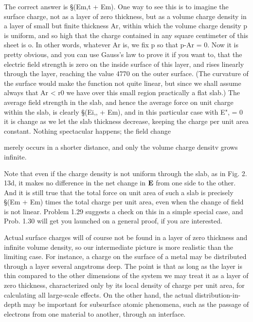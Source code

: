 The correct answer is §(Em,t + Em). One way to see this is to
imagine the surface charge, not as a layer of zero thickness, but as a
volume charge density in a layer of small but finite thickness Ar,
within which the volume charge density p is uniform, and so high that
the charge contained in any square centimeter of this sheet is o. In
other words, whatever Ar is, we fix p so that p-Ar = 0. Now it is
pretty obvious, and you can use Gauss's law to prove it if you want to,
that the electric field strength is zero on the inside surface of this
layer, and rises linearly through the layer, reaching the value 4770 on
the outer surface. (The curvature of the surface would make the
function not quite linear, but since we shall assume always that
Ar < r0 we have over this small region practically a flat slab.) The
average field strength in the slab, and hence the average force on unit
charge within the slab, is clearly §(Ei,, + Em), and in this particular
case with E", = 0 it is %
change as we let the slab thickness decrease, keeping the charge per
unit area constant. Nothing spectacular happens; the field change

merely occurs in a shorter distance, and only the volume charge
densitv grows infinite.

 

Note that even if the charge density is not uniform through the slab,
as in Fig. 2. 13d, it makes no difference in the net change in $\mathbf{E}$ from one
side to the other. And it is still true that the total force on unit area
of such a slab is precisely §(Em + Em) times the total charge per unit
area, even when the change of field is not linear. Problem 1.29 suggests
a check on this in a simple special case, and Prob. 1.30 will get
you launched on a general proof, if you are interested.

Actual surface charges will of course not be found in a layer of zero
thickness and infinite volume density, so our intermediate picture is
more realistic than the limiting case. For instance, a charge on the
surface of a metal may be distributed through a layer several
angstroms deep. The point is that as long as the layer is thin compared
to the other dimensions of the system we may treat it as a layer
of zero thickness, characterized only by its local density of charge
per unit area, for calculating all large-scale effects. On the other
hand, the actual distribution-in-depth may be important for subsurface
atomic phenomena, such as the passage of electrons from one
material to another, through an interface.


